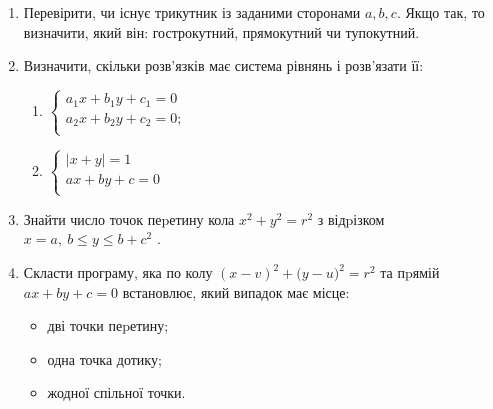 \documentclass[]{article}
\makeatletter
\newcommand{\xslalph}[1]{\expandafter\@xslalph\csname c@#1\endcsname}
\newcommand{\@xslalph}[1]{%
    \ifcase#1\or а\or б\or в\or г\or д\or e\or є\or ж\or з\or i%
    \or й\or к\or л\or м\or н\or о\or п\or р\or с\or т%
    \or у\or ф\or х\or ц\or ч\or ш\or ю\or я\or аа\or бб\or вв %
    \else\@ctrerr\fi%
}
\makeatother
\begin{document}
\begin{enumerate}
\item
  Перевірити, чи існує трикутник із заданими сторонами $a,b,c$.
  Якщо так, то визначити, який він: гострокутний, прямокутний чи
  тупокутний.

\item
  Визначити, скільки розв'язків має система рівнянь і розв'язати її:
  \begin{multicols}{2}
\begin{enumerate}[label=\xslalph*)]
\item \(\left\{ \begin{matrix}
a_{1}x + b_{1}y + c_{1} = 0 \\
a_{2}x + b_{2}y + c_{2} = 0; \\
\end{matrix} \right.\ \) 

\item \(\left\{ \begin{matrix}
\left| x + y \right| = 1 \\
ax + by + c = 0 \\
\end{matrix} \right.\ \)
\end{enumerate}
 \end{multicols}

\item
  Знайти число точок пеpетину кола \(x^{2} + y^{2} = r^{2}\) з відpізком
  \(x = a,\ b \leq y \leq b + c^{2}\) .
\item
  Скласти програму, яка по колу
  \({(x - v)}^{2} + ({y - u)}^{2} = r^{2}\) та пpямій
  \(ax + by + c = 0\) встановлює, який випадок має місце:
\begin{itemize}
\item дві точки пеpетину;
\item одна точка дотику;
\item жодної спільної точки.
\end{itemize}


\end{enumerate}
\end{document}

